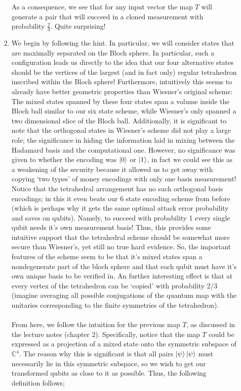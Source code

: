 \documentclass[12pt]{article}
\begin{document}
\begin{enumerate}
\begin{enumerate}
As a consequence, we see that for any input vector the map $T$ will generate a pair that will succeed in a cloned measurement with probability $\frac{2}{3}$. Quite surprising!
\item We begin by following the hint. In particular, we will consider states that are maximally separated on the Bloch sphere. In particular, such a configuration leads us directly to the idea that our four alternative states should be the vertices of the largest (and in fact only) regular tetrahedron inscribed within the Bloch sphere! Furthermore, intuitively this seems to already have better geometric properties than Wiesner's original scheme: The mixed states spanned by these four states span a volume inside the Bloch ball similar to our six state scheme, while Wiesner's only spanned a two dimensional slice of the Bloch ball. Additionally, it is significant to note that the orthogonal states in Wiesner's scheme did not play a large role; the significance in hiding the information laid in mixing between the Hadamard basis and the computational one. However, no significance was given to whether the encoding was $\ket{0}$ or $\ket{1}$, in fact we could see this as a weakening of the security because it allowed us to get away with copying `two types' of money encodings with only one basis measurement! Notice that the tetrahedral arrangement has no such orthogonal basis encodings; in this it even beats our 6 state encoding scheme from before (which is perhaps why it gets the same optimal attack error probability and saves on qubits). Namely, to succeed with probability 1 every single qubit needs it's own measurement basis! Thus, this provides some intuitive support that the tetrahedral scheme should be somewhat more secure than Wiesner's, yet still no true hard evidence. So, the important features of the scheme seem to be that it's mixed states span a nondegenerate part of the bloch sphere and that each qubit must have it's own unique basis to be verified in. An further interesting effect is that at every vertex of the tetrahedron can be `copied' with probability 2/3 (imagine averaging all possible conjugations of the quantum map with the unitaries corresponding to the finite symmetries of the tetrahedron). \\ \\
From here, we follow the intuition for the previous map $T$, as discussed in the lecture notes (chapter 2). Specifically, notice that the map $T$ could be expressed as a projection of a mixed state onto the symmetric subspace of $\mathbb{C}^4$. The reason why this is significant is that all pairs $\ket{\psi}\ket{\psi}$ must necessarily lie in this symmetric subspace, so we wish to get our transformed qubits as close to it as possible. Thus, the following definition follows;

\end{enumerate}
\end{enumerate}
\end{document}
